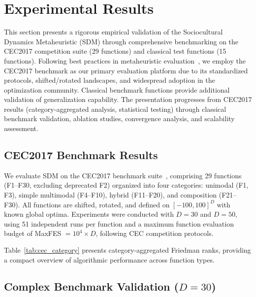 \documentclass[11pt]{article}
\begin{document}

\section{Experimental Results}
\label{sec:results}

This section presents a rigorous empirical validation of the Sociocultural Dynamics Metaheuristic (SDM) through comprehensive benchmarking on the CEC2017 competition suite (29 functions) and classical test functions (15 functions). Following best practices in metaheuristic evaluation~\citep{derrac2011practical}, we employ the CEC2017 benchmark as our primary evaluation platform due to its standardized protocols, shifted/rotated landscapes, and widespread adoption in the optimization community. Classical benchmark functions provide additional validation of generalization capability. The presentation progresses from CEC2017 results (category-aggregated analysis, statistical testing) through classical benchmark validation, ablation studies, convergence analysis, and scalability assessment.

\subsection{CEC2017 Benchmark Results}
\label{sec:cec2017_primary}

We evaluate SDM on the CEC2017 benchmark suite~\citep{awad2017cec}, comprising 29 functions (F1--F30, excluding deprecated F2) organized into four categories: unimodal (F1, F3), simple multimodal (F4--F10), hybrid (F11--F20), and composition (F21--F30). All functions are shifted, rotated, and defined on $[-100, 100]^D$ with known global optima. Experiments were conducted with $D=30$ and $D=50$, using 51 independent runs per function and a maximum function evaluation budget of MaxFES $= 10^4 \times D$, following CEC competition protocols.

Table~\ref{tab:cec_category} presents category-aggregated Friedman ranks, providing a compact overview of algorithmic performance across function types.

\subsection{Complex Benchmark Validation ($D=30$)}
\label{sec:complex_bench}
\end{document}
